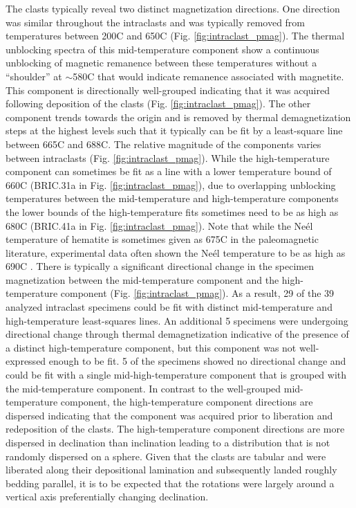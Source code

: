 \documentclass[11pt,letterpaper]{article}
\begin{document}
The clasts typically reveal two distinct magnetization directions. One direction was similar throughout the intraclasts and was typically removed from temperatures between 200\textdegree C and 650\textdegree C (Fig. \ref{fig:intraclast_pmag}). The thermal unblocking spectra of this mid-temperature component show a continuous unblocking of magnetic remanence between these temperatures without a ``shoulder'' at $\sim$580\textdegree C that would indicate remanence associated with magnetite. This component is directionally well-grouped indicating that it was acquired following deposition of the clasts (Fig. \ref{fig:intraclast_pmag}). The other component trends towards the origin and is removed by thermal demagnetization steps at the highest levels such that it typically can be fit by a least-square line between 665\textdegree C and 688\textdegree C. The relative magnitude of the components varies between intraclasts (Fig. \ref{fig:intraclast_pmag}). While the high-temperature component can sometimes be fit as a line with a lower temperature bound of 660\textdegree C (BRIC.31a in Fig. \ref{fig:intraclast_pmag}), due to overlapping unblocking temperatures between the mid-temperature and high-temperature components the lower bounds of the high-temperature fits sometimes need to be as high as 680\textdegree C (BRIC.41a in Fig. \ref{fig:intraclast_pmag}). Note that while the Ne\'el temperature of hematite is sometimes given as 675\textdegree C in the paleomagnetic literature, experimental data often shown the Ne\'el temperature to be as high as 690\textdegree C \citep{Ozdemir2006a}. There is typically a significant directional change in the specimen magnetization between the mid-temperature component and the high-temperature component (Fig. \ref{fig:intraclast_pmag}). As a result, 29 of the 39 analyzed intraclast specimens could be fit with distinct mid-temperature and high-temperature least-squares lines. An additional 5 specimens were undergoing directional change through thermal demagnetization indicative of the presence of a distinct high-temperature component, but this component was not well-expressed enough to be fit. 5 of the specimens showed no directional change and could be fit with a single mid-high-temperature component that is grouped with the mid-temperature component. In contrast to the well-grouped mid-temperature component, the high-temperature component directions are dispersed indicating that the component was acquired prior to liberation and redeposition of the clasts. The high-temperature component directions are more dispersed in declination than inclination leading to a distribution that is not randomly dispersed on a sphere. Given that the clasts are tabular and were liberated along their depositional lamination and subsequently landed roughly bedding parallel, it is to be expected that the rotations were largely around a vertical axis preferentially changing declination.
\end{document}
